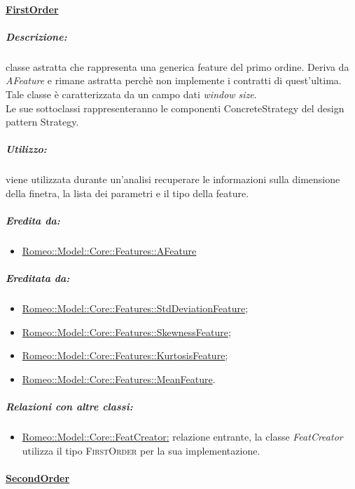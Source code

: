 		\paragraph{\underline{FirstOrder}}
		\label{features:fistorder}
		
			\subparagraph{Descrizione:} classe astratta che rappresenta una generica feature\g{} del primo ordine. Deriva da \textsl{AFeature} e rimane astratta perchè non implemente i contratti di quest'ultima.
			\\Tale classe è caratterizzata da un campo dati \textit{window size}. 
			\\Le sue sottoclassi rappresenteranno le componenti ConcreteStrategy del design pattern\g{} Strategy. 
			
			\subparagraph{Utilizzo:} viene utilizzata durante un’analisi recuperare le informazioni sulla dimensione della finetra, la lista dei parametri e il tipo della feature\g{}.
			
			\subparagraph{Eredita da:}
				\begin{itemize}
						\item \hyperref[features::features]{Romeo::Model::Core::Features::AFeature}
				\end{itemize}
				
			\subparagraph{Ereditata da:}
				\begin{itemize}
					\item \hyperref[]{Romeo::Model::Core::Features::StdDeviationFeature};
					\item \hyperref[]{Romeo::Model::Core::Features::SkewnessFeature};
					\item \hyperref[]{Romeo::Model::Core::Features::KurtosisFeature};
					\item \hyperref[]{Romeo::Model::Core::Features::MeanFeature}.
				\end{itemize}
				
			\subparagraph{Relazioni con altre classi:}
				\begin{itemize}
					\item \hyperref[]{Romeo::Model::Core::FeatCreator:} relazione entrante, la classe \textsl{FeatCreator} utilizza il tipo \textsc{FirstOrder} per la sua implementazione. 
				\end{itemize}
							
		\paragraph{\underline{SecondOrder}}
		\label{features:secondorder}
		
